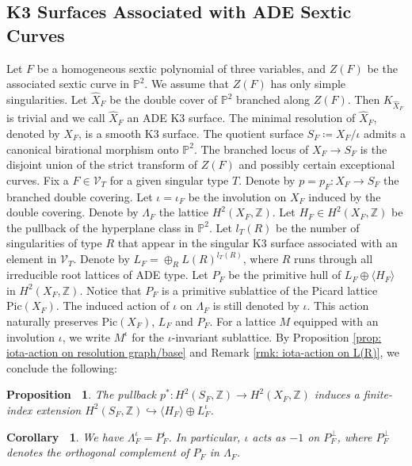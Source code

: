 \documentclass[12pt,reqno,a4paper]{amsart}
\newtheorem{prop}[thm]{Proposition~}
\newtheorem{cor}[thm]{Corollary~}
\theoremstyle{remark}
\theoremstyle{definition}
\begin{document}
\subsection{K3 Surfaces Associated with ADE Sextic Curves}
\label{subsection: ADE K3}
Let $F$ be a homogeneous sextic polynomial of three variables, and $Z(F)$ be the associated sextic curve in $\mathbb{P}^2$.
We assume that $Z(F)$ has only simple singularities.
Let $\widehat{X}_F$ be the double cover of $\mathbb{P}^2$ branched along $Z(F)$. Then $K_{\widehat{X}_F}$ is trivial and we call $\widehat{X}_F$ an ADE K3 surface.
The minimal resolution of $\widehat{X}_F$, denoted by $X_F$, is a smooth K3 surface. The quotient surface $S_F\coloneqq X_F/\iota$ admits a canonical birational morphism onto $\mathbb{P}^2$. The branched locus of $X_F\to S_F$ is the disjoint union of the strict transform of $Z(F)$ and possibly certain exceptional curves.
Fix a $F\in \mathcal{V}_{T}$ for a given singular type $T$. 
Denote by $p=p_F\colon X_F\to S_F$ the branched double covering.
Let $\iota=\iota_F$ be the involution on $X_F$ induced by the double covering.
Denote by $\Lambda_F$ the lattice $H^2(X_F, \mathbb{Z})$. 
Let $H_F\in H^2(X_F, \mathbb{Z})$ be the pullback of the hyperplane class in $\mathbb{P}^2$.
Let $l_{T}(R)$ be the number of singularities of type $R$ that appear in the singular K3 surface associated with an element in $\mathcal{V}_{T}$.
Denote by $L_F=\oplus_R L(R)^{l_{T}(R)}$, where $R$ runs through all irreducible root lattices of ADE type. Let $P_F$ be the primitive hull of $L_F\oplus \langle H_F\rangle$ in $H^2(X_F,\mathbb{Z})$. 
Notice that $P_F$ is a primitive sublattice of the Picard lattice $\mathrm{Pic}(X_F)$. The induced action of $\iota$ on $\Lambda_F$ is still denoted by $\iota$. This action naturally preserves $\mathrm{Pic}(X_F)$, $L_F$ and $P_F$.
For a lattice $M$ equipped with an involution $\iota$, we write $M^{\iota}$ for the $\iota$-invariant sublattice.
By Proposition \ref{prop: iota-action on resolution graph/base} and Remark \ref{rmk: iota-action on L(R)}, we conclude the following:
\begin{prop}
\label{prop: finite index H^2(S) to H oplus L^iota}
    The pullback $p^*\colon H^2(S_F,\mathbb{Z})\to H^2(X_F,\mathbb{Z})$ induces a finite-index extension $H^2(S_F,\mathbb{Z})\hookrightarrow \langle H_F \rangle\oplus L_F^{\iota}$. 
    \end{prop}
\begin{cor}
\label{cor: Lambda_F^iota = P_F^iota}
    We have $\Lambda_F^\iota = P_F^\iota$.
    In particular, $\iota$ acts as $-1$ on $P_F^\perp$, where $P_F^\perp$ denotes the orthogonal complement of $P_F$ in $\Lambda_F$. 
\end{cor}
\end{document}
